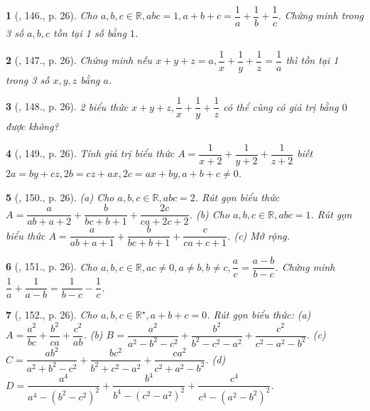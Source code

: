 \documentclass{article}
\newtheorem{baitoan}{}
\begin{document}
\begin{baitoan}[\cite{Binh_Toan_8_tap_1}, 146., p. 26]
	Cho $a,b,c\in\mathbb{R},abc = 1,a + b + c = \dfrac{1}{a} + \dfrac{1}{b} + \dfrac{1}{c}$. Chứng minh trong 3 số $a,b,c$ tồn tại 1 số bằng $1$.
\end{baitoan}

\begin{baitoan}[\cite{Binh_Toan_8_tap_1}, 147., p. 26]
	Chứng minh nếu $x + y + z = a,\dfrac{1}{x} + \dfrac{1}{y} + \dfrac{1}{z} = \dfrac{1}{a}$ thì tồn tại 1 trong 3 số $x,y,z$ bằng $a$.
\end{baitoan}

\begin{baitoan}[\cite{Binh_Toan_8_tap_1}, 148., p. 26]
	2 biểu thức $x + y + z,\dfrac{1}{x} + \dfrac{1}{y} + \dfrac{1}{z}$ có thể cùng có giá trị bằng $0$ được không? 
\end{baitoan}

\begin{baitoan}[\cite{Binh_Toan_8_tap_1}, 149., p. 26]
	Tính giá trị biểu thức $A = \dfrac{1}{x + 2} + \dfrac{1}{y + 2} + \dfrac{1}{z + 2}$ biết $2a = by + cz,2b = cz + ax,2c = ax + by,a + b + c\ne0$.
\end{baitoan}

\begin{baitoan}[\cite{Binh_Toan_8_tap_1}, 150., p. 26]
	(a) Cho $a,b,c\in\mathbb{R},abc = 2$. Rút gọn biểu thức $A = \dfrac{a}{ab + a + 2} + \dfrac{b}{bc + b + 1} + \dfrac{2c}{ca + 2c + 2}$. (b) Cho $a,b,c\in\mathbb{R},abc = 1$. Rút gọn biểu thức $A = \dfrac{a}{ab + a + 1} + \dfrac{b}{bc + b + 1} + \dfrac{c}{ca + c + 1}$. (c) Mở rộng.
\end{baitoan}

\begin{baitoan}[\cite{Binh_Toan_8_tap_1}, 151., p. 26]
	Cho $a,b,c\in\mathbb{R},ac\ne0,a\ne b,b\ne c,\dfrac{a}{c} = \dfrac{a - b}{b - c}$. Chứng minh $\dfrac{1}{a} + \dfrac{1}{a - b} = \dfrac{1}{b - c} - \dfrac{1}{c}$.
\end{baitoan}

\begin{baitoan}[\cite{Binh_Toan_8_tap_1}, 152., p. 26]
	Cho $a,b,c\in\mathbb{R}^\star,a + b + c = 0$. Rút gọn biểu thức: (a) $A = \dfrac{a^2}{bc} + \dfrac{b^2}{ca} + \dfrac{c^2}{ab}$. (b) $B = \dfrac{a^2}{a^2 - b^2 - c^2} + \dfrac{b^2}{b^2 - c^2 - a^2} + \dfrac{c^2}{c^2 - a^2 - b^2}$. (c) $C = \dfrac{ab^2}{a^2 + b^2 - c^2} + \dfrac{bc^2}{b^2 + c^2 - a^2} + \dfrac{ca^2}{c^2 + a^2 - b^2}$. (d) $D = \dfrac{a^4}{a^4 - (b^2 - c^2)^2} + \dfrac{b^4}{b^4 - (c^2 - a^2)^2} + \dfrac{c^4}{c^4 - (a^2 - b^2)^2}$. 
\end{baitoan}
\end{document}

